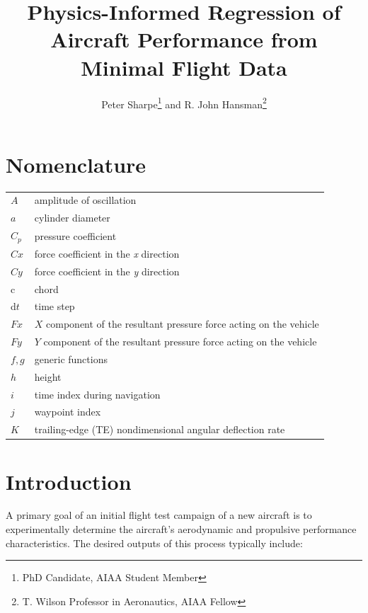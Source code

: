 \documentclass[conf]{new-aiaa}
\title{Physics-Informed Regression of Aircraft Performance from Minimal Flight Data}
\author{Peter Sharpe\footnote{PhD Candidate, AIAA Student Member} and R. John Hansman\footnote{T. Wilson Professor in Aeronautics, AIAA Fellow}}
\affil{Massachusetts Institute of Technology, Cambridge, MA}
\begin{document}
    

    \maketitle

    \begin{abstract}

    \end{abstract}

    \section{Nomenclature}

    {\renewcommand\arraystretch{1.0}
    \noindent\begin{longtable*}{@{}l @{\quad=\quad} l@{}}
                 $A$  & amplitude of oscillation \\
                 $a$ &    cylinder diameter \\
                 $C_p$& pressure coefficient \\
                 $Cx$ & force coefficient in the \textit{x} direction \\
                 $Cy$ & force coefficient in the \textit{y} direction \\
                 c   & chord \\
                 d$t$ & time step \\
                 $Fx$ & $X$ component of the resultant pressure force acting on the vehicle \\
                 $Fy$ & $Y$ component of the resultant pressure force acting on the vehicle \\
                 $f, g$   & generic functions \\
                 $h$  & height \\
                 $i$  & time index during navigation \\
                 $j$  & waypoint index \\
                 $K$  & trailing-edge (TE) nondimensional angular deflection rate
    \end{longtable*}}


    \section{Introduction}

    A primary goal of an initial flight test campaign of a new aircraft is to experimentally determine the aircraft's aerodynamic and propulsive performance characteristics. The desired outputs of this process typically include:
\end{document}
